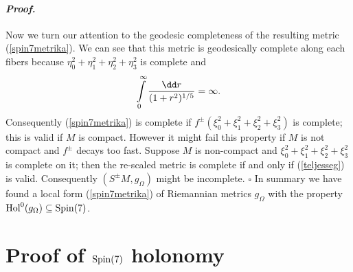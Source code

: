 \documentclass[a4paper,12pt,draft]{article}
\newenvironment{proof}{\paragraph{\it Proof.}}{$\square$\vskip0.4cm}
\begin{document}
\begin{proof}
Now we turn our attention to the geodesic completeness of the resulting
metric (\ref{spin7metrika}). We can see that this metric is geodesically
complete along each fibers because $\eta_0^2 +\eta_1^2+\eta_2^2+\eta_3^2$
is complete and 
\[\int\limits_0^\infty {\dd r\over (1+r^2)^{1/5}}=\infty .\]
Consequently (\ref{spin7metrika}) is complete if
$f^\pm\left(\xi_0^2+\xi_1^2+\xi_2^2+\xi_3^2\right)$ is complete; this is
valid if $M$ is compact. However it might fail this property if $M$ is not
compact and $f^\pm$ decays too fast. Suppose
$M$ is non-compact and $\xi_0^2+\xi_1^2+\xi_2^2+\xi_3^2$ is complete on
it; then the re-scaled metric is complete if and only if
(\ref{teljesseg}) is valid. Consequently $(S^\pm M, g_\Omega )$ might be 
incomplete.
\end{proof}
In summary we have found a local form (\ref{spin7metrika}) of Riemannian
metrics $g_\Omega $ with the property ${\rm Hol}^0(g_\Omega )\subseteq
{\rm Spin}(7)$. 

\section{Proof of ${\rm Spin}(7)$ holonomy}
\end{document}
